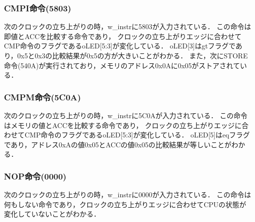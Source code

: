 \documentclass[a4paper,11pt]{ltjsarticle}
\begin{document}
\subsubsection{CMPI命令(5803)}
次のクロックの立ち上がりの時，w\_instrに5803が入力されている．
この命令は即値とACCを比較する命令であり，
クロックの立ち上がりエッジに合わせてCMP命令のフラグであるoLED[5:3]が変化している．
oLED[3]はgtフラグであり，0x5と0x3の比較結果が0x5の方が大きいことがわかる．
また，次にSTORE命令(540A)が実行されており，メモリのアドレス0x0Aに0x05がストアされている．
\subsubsection{CMPM命令(5C0A)}
次のクロックの立ち上がりの時，w\_instrに5C0Aが入力されている．
この命令はメモリの値とACCを比較する命令であり，
クロックの立ち上がりエッジに合わせてCMP命令のフラグであるoLED[5:3]が変化している．
oLED[5]はeqフラグであり，アドレス0xAの値0x05とACCの値0x05の比較結果が等しいことがわかる．
\subsubsection{NOP命令(0000)}
次のクロックの立ち上がりの時，w\_instrに0000が入力されている．
この命令は何もしない命令であり，クロックの立ち上がりエッジに合わせてCPUの状態が変化していないことがわかる．
\end{document}
